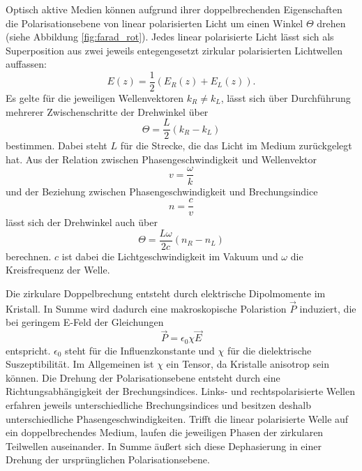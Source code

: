 \label{sub:doppel}
Optisch aktive Medien können aufgrund ihrer doppelbrechenden Eigenschaften die Polarisationsebene von linear polarisierten Licht um einen Winkel $\Theta$ drehen (siehe Abbildung \ref{fig:farad_rot}).
Jedes linear polarisierte Licht lässt sich als Superposition aus zwei jeweils entegengesetzt zirkular polarisierten Lichtwellen auffassen:
\begin{equation*}
    E(z) = \frac{1}{2} (E_R(z)+E_L(z)).
\end{equation*}
Es gelte für die jeweiligen Wellenvektoren $k_R \neq k_L$, lässt sich über Durchführung mehrerer Zwischenschritte der Drehwinkel über
\begin{equation}
    \Theta = \frac{L}{2}(k_R-k_L)
\end{equation}
bestimmen. Dabei steht $L$ für die Strecke, die das Licht im Medium zurückgelegt hat.
Aus der Relation zwischen Phasengeschwindigkeit und Wellenvektor
\begin{equation*}
    v = \frac{\omega}{k}
\end{equation*}
und der Beziehung zwischen Phasengeschwindigkeit und Brechungsindice
\begin{equation*}
    n = \frac{c}{v}
\end{equation*}
lässt sich der Drehwinkel auch über
\begin{equation}
    \Theta = \frac{L\omega}{2c}(n_R-n_L)
\end{equation}
berechnen. $c$ ist dabei die Lichtgeschwindigkeit im Vakuum und $\omega$ die Kreisfrequenz der Welle.




Die zirkulare Doppelbrechung entsteht durch elektrische Dipolmomente im Kristall.
In Summe wird dadurch eine makroskopische Polaristion $\vec{P}$ induziert, die bei geringem E-Feld der Gleichungen
\begin{equation*}
    \vec{P} = \epsilon_0 \chi \vec{E}
\end{equation*}
entspricht.
$\epsilon_0$ steht für die Influenzkonstante und $\chi$ für die dielektrische Suszeptibilität.
Im Allgemeinen ist $\chi$ ein Tensor, da Kristalle anisotrop sein können.
Die Drehung der Polarisationsebene entsteht durch eine Richtungsabhängigkeit der Brechungsindices. 
Links- und rechtspolarisierte Wellen erfahren jeweils unterschiedliche Brechungsindices und besitzen deshalb unterschiedliche Phasengeschwindigkeiten.
Trifft die linear polarisierte Welle auf ein doppelbrechendes Medium, laufen die jeweiligen Phasen der zirkularen Teilwellen auseinander.
In Summe äußert sich diese Dephasierung in einer Drehung der ursprünglichen Polarisationsebene.


